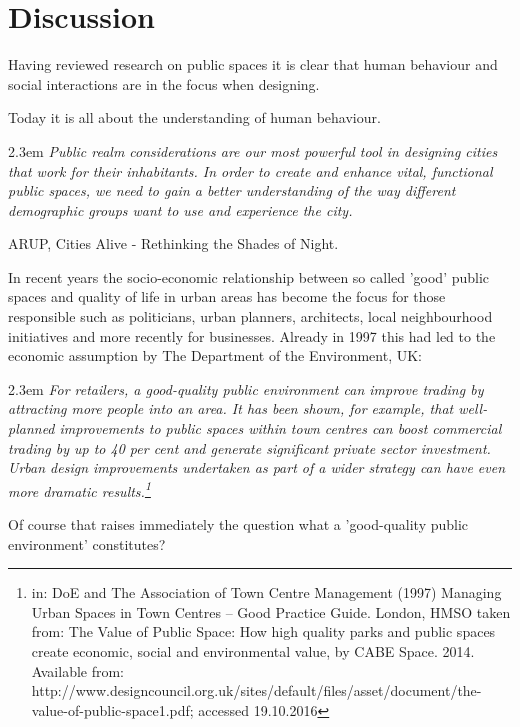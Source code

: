 
\section {Discussion}

Having reviewed research on public spaces it is clear that human behaviour and social interactions are in the focus when designing.


Today it is all about the understanding of human behaviour.


\begin{singlespace}
	\leftskip2.3em
		\rightskip\leftskip
			\textit{\small Public realm considerations are our most powerful tool in designing cities that work for their inhabitants. In order to create and enhance vital, functional public spaces, we need to gain a better understanding of the way different demographic groups want to use and experience the city.}
	
    \small ARUP, Cities Alive - Rethinking the Shades of Night.\\
\end{singlespace}


In recent years the socio-economic relationship between so called 'good' public spaces and quality of life in urban areas has become the focus for those responsible such as politicians, urban planners, architects, local neighbourhood initiatives and more recently for businesses.  
Already in 1997 this had led to the economic assumption by The Department of the Environment, UK:

\begin{singlespace}
	\leftskip2.3em
		\rightskip\leftskip
			\textit{\small For retailers, a good-quality public environment can improve trading by attracting more people into an area. It has been shown, for example, that well-planned improvements to public spaces within town centres can boost commercial trading by up to 40 per cent and generate significant private sector investment. Urban design improvements undertaken as part of a wider strategy can have even more dramatic results.\footnote{in: DoE and The Association of Town Centre
Management (1997) Managing Urban Spaces in Town Centres – Good Practice Guide. London, HMSO taken from: The Value of Public Space: How high quality parks and public spaces create economic, social and environmental value, by CABE Space. 2014. Available from: http://www.designcouncil.org.uk/sites/default/files/asset/document/the-value-of-public-space1.pdf; accessed 19.10.2016}}
\end{singlespace}

Of course that raises immediately the question what a 'good-quality public environment' constitutes?

